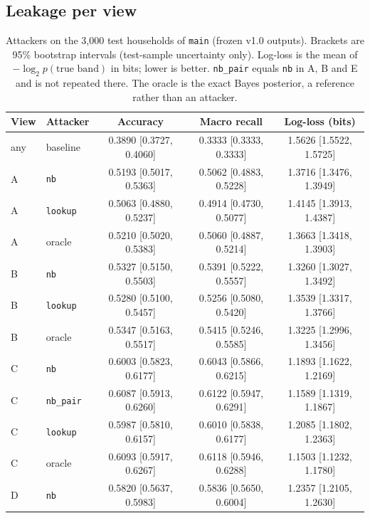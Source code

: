 \documentclass[11pt]{article}
\newcommand{\code}[1]{\texttt{#1}}
\begin{document}
\subsection{Leakage per view}

\begin{table}[htbp]
\centering\footnotesize
\caption{Attackers on the 3,000 test households of \code{main} (frozen v1.0 outputs). Brackets are 95\% bootstrap intervals (test-sample uncertainty only). Log-loss is the mean of $-\log_2 p(\text{true band})$ in bits; lower is better. \code{nb\_pair} equals \code{nb} in A, B and E and is not repeated there. The oracle is the exact Bayes posterior, a reference rather than an attacker.}
\label{tab:attackers}
\setlength{\tabcolsep}{4.5pt}
\begin{tabular}{@{}llccc@{}}
\toprule
View & Attacker & Accuracy & Macro recall & Log-loss (bits) \\
\midrule
any & baseline & 0.3890 [0.3727, 0.4060] & 0.3333 [0.3333, 0.3333] & 1.5626 [1.5522, 1.5725] \\
\midrule
A & \code{nb} & 0.5193 [0.5017, 0.5363] & 0.5062 [0.4883, 0.5228] & 1.3716 [1.3476, 1.3949] \\
A & \code{lookup} & 0.5063 [0.4880, 0.5237] & 0.4914 [0.4730, 0.5077] & 1.4145 [1.3913, 1.4387] \\
A & oracle & 0.5210 [0.5020, 0.5383] & 0.5060 [0.4887, 0.5214] & 1.3663 [1.3418, 1.3903] \\
\midrule
B & \code{nb} & 0.5327 [0.5150, 0.5503] & 0.5391 [0.5222, 0.5557] & 1.3260 [1.3027, 1.3492] \\
B & \code{lookup} & 0.5280 [0.5100, 0.5457] & 0.5256 [0.5080, 0.5420] & 1.3539 [1.3317, 1.3766] \\
B & oracle & 0.5347 [0.5163, 0.5517] & 0.5415 [0.5246, 0.5585] & 1.3225 [1.2996, 1.3456] \\
\midrule
C & \code{nb} & 0.6003 [0.5823, 0.6177] & 0.6043 [0.5866, 0.6215] & 1.1893 [1.1622, 1.2169] \\
C & \code{nb\_pair} & 0.6087 [0.5913, 0.6260] & 0.6122 [0.5947, 0.6291] & 1.1589 [1.1319, 1.1867] \\
C & \code{lookup} & 0.5987 [0.5810, 0.6157] & 0.6010 [0.5838, 0.6177] & 1.2085 [1.1802, 1.2363] \\
C & oracle & 0.6093 [0.5917, 0.6267] & 0.6118 [0.5946, 0.6288] & 1.1503 [1.1232, 1.1780] \\
\midrule
D & \code{nb} & 0.5820 [0.5637, 0.5983] & 0.5836 [0.5650, 0.6004] & 1.2357 [1.2105, 1.2630] \\

\end{tabular}
\end{table}
\end{document}
